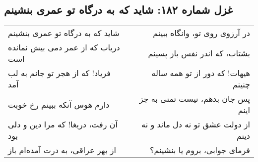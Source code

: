\begin{center}
\section*{غزل شماره ۱۸۲: شاید که به درگاه تو عمری بنشینم}
\label{sec:182}
\begin{longtable}{l p{0.5cm} r}
شاید که به درگاه تو عمری بنشینم
&&
در آرزوی روی تو، وانگاه ببینم
\\
دریاب که از عمر دمی بیش نمانده است
&&
بشتاب، که اندر نفس باز پسینم
\\
فریاد! که از هجر تو جانم به لب آمد
&&
هیهات! که دور از تو همه ساله چنینم
\\
دارم هوس آنکه ببینم رخ خوبت
&&
پس جان بدهم، نیست تمنی به جز اینم
\\
آن رفت، دریغا! که مرا دین و دلی بود
&&
از دولت عشق تو نه دل ماند و نه دینم
\\
از بهر عراقی، به درت آمده‌ام باز
&&
فرمای جوابی، بروم یا بنشینم؟
\\
\end{longtable}
\end{center}

